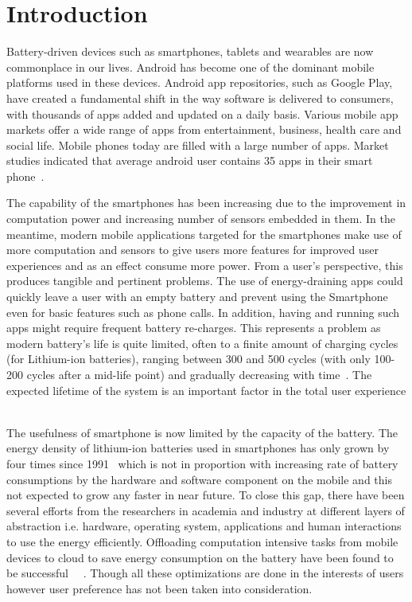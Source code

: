 \section{Introduction}
\label{intro}



Battery-driven devices such as smartphones, tablets and wearables are now commonplace in our lives. Android has become one of the dominant mobile platforms used in these devices. Android app repositories, such as Google Play, have created a fundamental shift in the way software is delivered to consumers, with thousands of apps added and updated on a daily basis. Various mobile app markets offer a wide range of apps from entertainment, business, health care and social life. Mobile phones today are filled with a large number of apps. Market studies indicated that average android user contains 35 apps in their smart phone~\cite{thinkwithgoogle}. 

The capability of the smartphones has been increasing due to the improvement in computation power and increasing number of sensors embedded in them. In the meantime, modern mobile applications targeted for the smartphones make use of more computation and sensors to give users more features for improved user experiences and as an effect consume more power. From a user’s perspective, this produces tangible and pertinent problems. The use of energy-draining apps could quickly leave a user with an empty battery and prevent using the Smartphone even for basic features such as phone calls. In addition, having and running such apps might require frequent battery re-charges. This represents a problem as modern battery’s life is quite limited, often to a finite amount of charging cycles (for Lithium-ion batteries), ranging between 300 and 500 cycles (with only 100-200 cycles after a mid-life point) and gradually decreasing with time~\cite{linares2014mining}. The expected lifetime of the system is an important factor in the total user experience ~\cite{kim2013event} ~\cite{li2013energy}

The usefulness of smartphone is now limited by the capacity of the battery. The energy density of lithium-ion batteries used in smartphones has only grown by four times since 1991~\cite{janek2016solid} which is not in proportion with increasing rate of battery consumptions by the hardware and software component on the mobile and this not expected to grow any faster in near future. To close this gap, there have been several efforts from the researchers in academia and industry at different layers of abstraction i.e. hardware, operating system, applications and human interactions to use the energy efficiently. Offloading computation intensive tasks from mobile devices to cloud to save energy consumption on the battery have been found to be successful~\cite{lai2017furion} ~\cite{boos2016flashback}. Though all these optimizations are done in the interests of users however user preference has not been taken into consideration.
 
